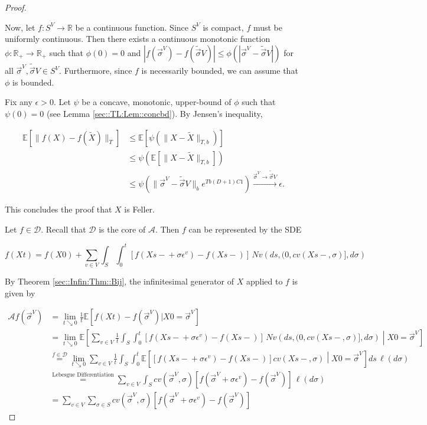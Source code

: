 \documentclass[12pt]{article}
\newcommand{\mb}{\mathbb}
\newcommand{\mc}{\mathcal}
\newcommand{\ra}{\rightarrow}
\newcommand{\os}{\overset}
\newcommand{\te}{\text}
\newcommand{\ep}{\epsilon}
\newcommand{\ind}{\hspace{24pt}}
\newcommand{\ex}[1]{\mb{E}\left[#1\right]}			%
\renewcommand{\v}{v}							%
\renewcommand{\S}{S}							%
\newcommand{\s}{\sigma}							%
\newcommand{\sv}{\vec{\s}}						%
\renewcommand{\b}{b}							%
\newcommand{\ev}{\ep}							%
\newcommand{\T}{T}								%
\renewcommand{\t}{t}							%
\renewcommand{\tt}{s}							%
\newcommand{\X}{X}								%
\newcommand{\IG}{\mc{A}}						%
\newcommand{\IGr}{c}							%
\newcommand{\vind}[1]{^{#1}}					%
\newcommand{\carp}[1]{^{#1}}					%
\newcommand{\vsi}[1]{^{#1}}						%
\newcommand{\cind}[1]{_{#1}}					%
\newcommand{\const}{C}							%
\newcommand{\degr}{D}							%
\newcommand{\core}{\mc{D}}						%
\newcommand{\poiss}{N}							%
\newcommand{\Sm}{\ell}							%
\newcommand{\alt}[1]{\widetilde{#1}}			%
\begin{document}
\begin{proof}
\begin{enumerate}[(a)]
Now, let \(f: \S\carp{V} \ra \mb{R}\) be a continuous function. Since \(\S\carp{V}\) is compact, \(f\) must be uniformly continuous. Then there exists a continuous monotonic function \(\phi: \mb{R}_+ \ra \mb{R}_+\) such that \(\phi(0) = 0\) and \(|f(\sv\cind{}\vsi{V}) - f(\alt{\sv}{}{V})| \leq \phi(|\sv\cind{}\vsi{V} - \alt{\sv}{}{V}|)\) for all \(\sv\cind{}\vsi{V},\alt{\sv}{}{V}\in \S\carp{V}\). Furthermore, since \(f\) is necessarily bounded, we can assume that \(\phi\) is bounded.

\ind Fix any \(\ep > 0\). Let \(\psi\) be a concave, monotonic, upper-bound of \(\phi\) such that \(\psi(0) = 0\) (see Lemma \ref{sec::TL:Lem::concbd}). By Jensen's inequality,

\begin{align*}
\ex{\|f(\X{}{}) - f(\alt{\X}{}{})\|_\T} &\leq \ex{\psi\left(\|\X{}{} - \alt{\X}{}{}\|_{\T,\b}\right)}\\
&\leq \psi\left(\ex{\|\X{}{} - \alt{\X}{}{}\|_{\T,\b}}\right)\\
&\leq \psi\left(\|\sv\cind{}\vsi{V} - \alt{\sv}{}{V}\|_{\b}e^{\T\b(\degr+1)\const{1}}\right) \os{\sv\cind{}\vsi{V} \ra\alt{\sv}{}{V}}{\ra} \ep.
\end{align*}

This concludes the proof that \(\X{}{}\) is Feller.
\end{enumerate}

Let \(f \in \core\). Recall that \(\core\) is the core of \(\IG\). Then \(f\) can be represented by the SDE

\[f(\X{}{\t}) = f(\X{}{0}) + \sum_{\v \in V} \int_\S\int_0^\t [f(\X{}{\tt-} + \s\ev\vind{\v}) - f(\X{}{\tt-})]\,\poiss{\v}\left(d\tt,(0,\IGr{\v}(\X{}{\tt-},\s)],d\s\right)\]


By Theorem \ref{sec::Infin:Thm::Bij}, the infinitesimal generator of \(\X{}{}\) applied to \(f\) is given by 

\begin{align*}
\IG f(\sv\cind{}\vsi{V}) &= \lim_{\t \searrow 0} \frac{1}{\t} \ex{f(\X{}{\t}) - f(\sv\cind{}\vsi{V})|\X{}{0} = \sv\cind{}\vsi{V}}\\
&= \lim_{\t \searrow 0} \ex{\sum_{\v \in V} \frac{1}{\t}\int_\S\int_0^\t \left[f(\X{}{\tt-} + \s\ev\vind{\v}) - f(\X{}{\tt-})\right]\,\poiss{\v}\left(d\tt,(0,\IGr{\v}(\X{}{\tt-},\s)],d\s\right)\middle|\X{}{0} = \sv\cind{}\vsi{V}}\\
&\os{f \in \mc{D}}{=} \lim_{\t \searrow 0}\sum_{\v \in V} \frac{1}{\t}\int_\S\int_0^\t \ex{\left[f(\X{}{\tt-} + \s\ev\vind{\v}) - f(\X{}{\tt-})\right]\IGr{\v}(\X{}{\tt-},\s)\middle|\X{}{0} = \sv\cind{}\vsi{V}}d\tt\,\Sm(d\s)\\
&\os{\te{Lebesgue Differentiation}}{=} \sum_{\v \in V} \int_\S \IGr{\v}(\sv\cind{}\vsi{V},\s)[f(\sv\cind{}\vsi{V} + \s\ev\vind{\v}) - f(\sv\cind{}\vsi{V})]\,\Sm(d\s)\\
&= \sum_{\v \in V} \sum_{\s \in \S} \IGr{\v}(\sv\cind{}\vsi{V},\s)[f(\sv\cind{}\vsi{V} + \s\ev\vind{\v}) - f(\sv\cind{}\vsi{V})]
\end{align*}
\end{proof}
\end{document}
